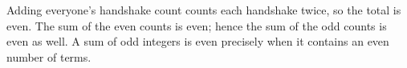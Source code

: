 Adding everyone's handshake count counts each handshake twice, so the total is even. The sum of the even counts is even; hence the sum of the odd counts is even as well. A sum of odd integers is even precisely when it contains an even number of terms.
